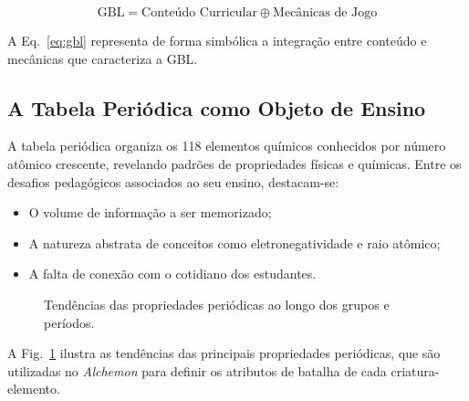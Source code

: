 \begin{equation}
    \text{GBL} = \text{Conteúdo Curricular} \oplus \text{Mecânicas de Jogo}
    \label{eq:gbl}
\end{equation}

A Eq.~\eqref{eq:gbl} representa de forma simbólica a integração entre
conteúdo e mecânicas que caracteriza a GBL.

\subsection{A Tabela Periódica como Objeto de Ensino}

A tabela periódica organiza os 118 elementos químicos conhecidos por número
atômico crescente, revelando padrões de propriedades físicas e químicas.
Entre os desafios pedagógicos associados ao seu ensino, destacam-se:

\begin{itemize}
    \item O volume de informação a ser memorizado;
    \item A natureza abstrata de conceitos como eletronegatividade e raio atômico;
    \item A falta de conexão com o cotidiano dos estudantes.
\end{itemize}

\begin{figure}[htbp]
    \centering
    \caption{Tendências das propriedades periódicas ao longo dos grupos e períodos.}
    \label{fig:propriedades}
\end{figure}

A Fig.~\ref{fig:propriedades} ilustra as tendências das principais propriedades
periódicas, que são utilizadas no \textit{Alchemon} para definir os atributos
de batalha de cada criatura-elemento.

